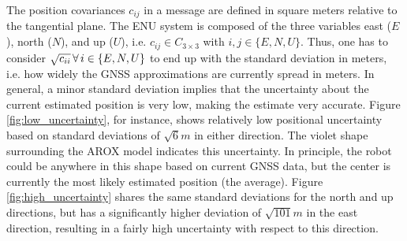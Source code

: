\documentclass[english, master, utf8]{base/thesis_KBS}
\newcommand{\code}{\collectverb{\codebox}}
\begin{document}
\noindent
The position covariances $c_{ij}$ in a \code{NavSatFix} message are defined in square meters relative to the tangential plane.
The ENU system is composed of the three variables east ($E$), north ($N$), and up ($U$), i.e. $c_{ij} \in C_{3 \times 3}$ with $i, j \in \{E, N, U\}$.
Thus, one has to consider $\sqrt{c_{ii}} \thinspace \forall \thinspace i \in \{E, N, U\}$ to end up with the standard deviation in meters, i.e. how widely the GNSS approximations are
currently spread in meters. In general, a minor standard deviation implies that the uncertainty about the current estimated position is very low, making the estimate very accurate.
Figure \ref{fig:low_uncertainty}, for instance, shows relatively low positional uncertainty based on standard deviations of $\sqrt{6}m$ in either direction. The violet shape
surrounding the AROX model indicates this uncertainty. In principle, the robot could be anywhere in this shape based on current GNSS data, but the center is currently the most likely
estimated position (the average). Figure \ref{fig:high_uncertainty} shares the same standard deviations for the north and up directions, but has a significantly higher deviation of
$\sqrt{101}m$ in the east direction, resulting in a fairly high uncertainty with respect to this direction.
\end{document}
